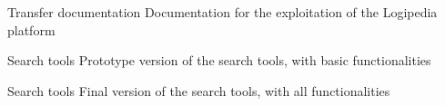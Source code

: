 \begin{workpackage}[id=access,type=RTD,
  short=Access,%
  title={Access},
  lead=Irt,IrtRM=23,OcaRM=6,EduRM=12,InrRM=18]
\begin{wpdelivs}
  \begin{wpdeliv}[due=29,miles=???,id=transfer-doc,dissem=PU,nature=R,lead=Irt]{Transfer documentation}
    Documentation for the exploitation of the Logipedia platform
  \end{wpdeliv}

  
  \begin{wpdeliv}[due=17,miles=???,id=search1,dissem=PU,nature=DEM,lead=Inr]{Search tools}
    Prototype version of the search tools, with basic functionalities
  \end{wpdeliv}

  \begin{wpdeliv}[due=30,miles=???,id=search2,dissem=PU,nature=OTHER,lead=Inr]{Search tools}
    Final version of the search tools, with all functionalities
  \end{wpdeliv}
    
\end{wpdelivs}

\end{workpackage}

